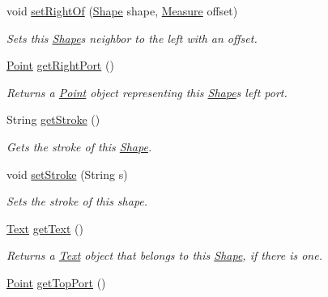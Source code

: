 \begin{DoxyCompactItemize}
void \hyperlink{classcom_1_1aarrelaakso_1_1drawl_1_1_shape_a5bdc7b20e5863cf6c83a8abe57ce1399}{set\+Right\+Of} (\hyperlink{classcom_1_1aarrelaakso_1_1drawl_1_1_shape}{Shape} shape, \hyperlink{classcom_1_1aarrelaakso_1_1drawl_1_1_measure}{Measure} offset)
\begin{DoxyCompactList}\small\item\em Sets this \hyperlink{classcom_1_1aarrelaakso_1_1drawl_1_1_shape}{Shape}\textquotesingle{}s neighbor to the left with an offset. \end{DoxyCompactList}\item 
\hyperlink{classcom_1_1aarrelaakso_1_1drawl_1_1_point}{Point} \hyperlink{classcom_1_1aarrelaakso_1_1drawl_1_1_shape_a319c78d425ec91e1aef1072a95e349ad}{get\+Right\+Port} ()
\begin{DoxyCompactList}\small\item\em Returns a \hyperlink{classcom_1_1aarrelaakso_1_1drawl_1_1_point}{Point} object representing this \hyperlink{classcom_1_1aarrelaakso_1_1drawl_1_1_shape}{Shape}\textquotesingle{}s left port. \end{DoxyCompactList}\item 
String \hyperlink{classcom_1_1aarrelaakso_1_1drawl_1_1_shape_a4e1d54c7e161e3af5053939ddefdf9e6}{get\+Stroke} ()
\begin{DoxyCompactList}\small\item\em Gets the stroke of this \hyperlink{classcom_1_1aarrelaakso_1_1drawl_1_1_shape}{Shape}. \end{DoxyCompactList}\item 
void \hyperlink{classcom_1_1aarrelaakso_1_1drawl_1_1_shape_a3930f6fe72f6c5e0c0aa4c25ffbf18ff}{set\+Stroke} (String s)
\begin{DoxyCompactList}\small\item\em Sets the stroke of this shape. \end{DoxyCompactList}\item 
\hyperlink{classcom_1_1aarrelaakso_1_1drawl_1_1_text}{Text} \hyperlink{classcom_1_1aarrelaakso_1_1drawl_1_1_shape_a6f876978d4102974fedc5b41c93c7b26}{get\+Text} ()
\begin{DoxyCompactList}\small\item\em Returns a \hyperlink{classcom_1_1aarrelaakso_1_1drawl_1_1_text}{Text} object that belongs to this \hyperlink{classcom_1_1aarrelaakso_1_1drawl_1_1_shape}{Shape}, if there is one. \end{DoxyCompactList}\item 
\hyperlink{classcom_1_1aarrelaakso_1_1drawl_1_1_point}{Point} \hyperlink{classcom_1_1aarrelaakso_1_1drawl_1_1_shape_aed4e9caa294aacc973b7a531a960e9e5}{get\+Top\+Port} ()

\end{DoxyCompactItemize}
